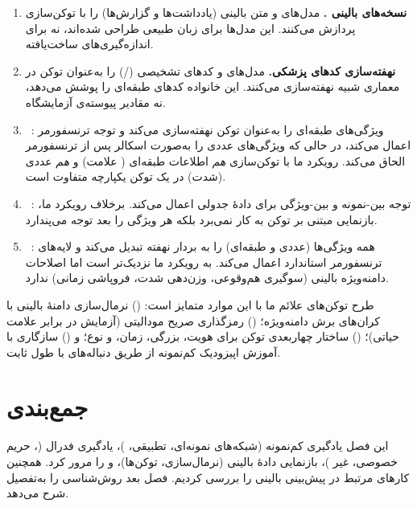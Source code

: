 \begin{enumerate}
\item \textbf{نسخه‌های بالینی .} مدل‌های  \cite{alsentzer2019publicly} و  \cite{lee2020biobert} متن بالینی (یادداشت‌ها و گزارش‌ها) را با توکن‌سازی  پردازش می‌کنند. این مدل‌ها برای زبان طبیعی طراحی شده‌اند، نه برای اندازه‌گیری‌های ساخت‌یافته.
\item \textbf{نهفته‌سازی کدهای پزشکی.} مدل‌های  \cite{li2020behrt} و  \cite{rasmy2021med} کدهای تشخیصی (/) را به‌عنوان توکن در معماری شبیه  نهفته‌سازی می‌کنند. این خانواده کدهای طبقه‌ای را پوشش می‌دهد، نه مقادیر پیوسته‌ی آزمایشگاه.
\item \textbf{}~\cite{huang2020tabtransformer}: ویژگی‌های طبقه‌ای را به‌عنوان توکن نهفته‌سازی می‌کند و توجه ترنسفورمر اعمال می‌کند، در حالی که ویژگی‌های عددی را به‌صورت اسکالر پس از ترنسفورمر الحاق می‌کند. رویکرد ما با توکن‌سازی \emph{هم} اطلاعات طبقه‌ای ( علامت) و \emph{هم} عددی (شدت) در یک توکن یکپارچه متفاوت است.
\item \textbf{}~\cite{somepalli2021saint}: توجه بین-نمونه و بین-ویژگی برای دادۀ جدولی اعمال می‌کند. برخلاف رویکرد ما،  بازنمایی مبتنی بر توکن به کار نمی‌برد بلکه هر ویژگی را بعد توجه می‌پندارد.
\item \textbf{}~\cite{gorishniy2024revisiting}: همه ویژگی‌ها (عددی و طبقه‌ای) را به بردار نهفته تبدیل می‌کند و لایه‌های ترنسفورمر استاندارد اعمال می‌کند. به رویکرد ما نزدیک‌تر است اما اصلاحات دامنه‌ویژه بالینی (سوگیری هم‌وقوعی، وزن‌دهی شدت، فروپاشی زمانی) ندارد.
\end{enumerate}

طرح توکن‌های علائم ما با این موارد متمایز است: () نرمال‌سازی دامنۀ بالینی با کران‌های برش دامنه‌ویژه؛ () رمزگذاری صریح مودالیتی (آزمایش در برابر علامت حیاتی)؛ () ساختار چهاربعدی توکن برای هویت، بزرگی، زمان، و نوع؛ و () سازگاری با آموزش اپیزودیک کم‌نمونه از طریق دنباله‌های با طول ثابت.

\section{جمع‌بندی}

این فصل یادگیری کم‌نمونه (شبکه‌های نمونه‌ای، تطبیقی، )، یادگیری فدرال (، حریم خصوصی، غیر )، بازنمایی دادۀ بالینی (نرمال‌سازی، توکن‌ها)، و  را مرور کرد. همچنین کارهای مرتبط در پیش‌بینی بالینی را بررسی کردیم. فصل بعد روش‌شناسی را به‌تفصیل شرح می‌دهد.

